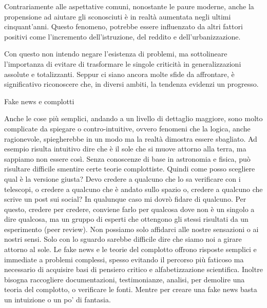 \documentclass[12pt]{book} %
\begin{document}
Contrariamente alle aspettative comuni, nonostante le paure moderne, anche la propensione ad aiutare gli sconosciuti è in realtà aumentata negli ultimi cinquant’anni. Questo fenomeno, potrebbe essere influenzato da altri fattori positivi come l’incremento dell’istruzione, del reddito e  dell’urbanizzazione.

Con questo non intendo negare l'esistenza di problemi, ma sottolineare l'importanza di evitare di trasformare le singole criticità in generalizzazioni assolute e totalizzanti. Seppur ci siano ancora molte sfide da affrontare, è significativo riconoscere che, in diversi ambiti, la tendenza evidenzi un progresso.

\begin{mdframed}[linewidth=1pt]
Fake news e complotti

Anche le cose più semplici, andando a un livello di dettaglio maggiore, sono molto complicate da spiegare o
contro-intuitive, ovvero fenomeni che la logica, anche ragionevole, spiegherebbe in un modo ma la realtà dimostra essere sbagliato. Ad esempio risulta intuitivo dire che è il sole che si muove attorno alla terra, ma sappiamo non essere così. 
Senza conoscenze di base in astronomia e fisica, può risultare difficile smentire certe teorie complottiste.
Quindi come posso scegliere qual è la versione giusta? 
Devo credere a qualcuno che lo sa verificare con i telescopi, o credere a qualcuno che è andato sullo
spazio o, credere a qualcuno che scrive un post sui social? In qualunque caso mi dovrò fidare di qualcuno. Per questo,
credere per credere, conviene farlo per qualcosa dove non è un singolo a dire qualcosa, ma un gruppo di esperti che
ottengono gli stessi risultati da un esperimento (peer review). Non possiamo solo affidarci alle nostre sensazioni o ai
nostri sensi. Solo con lo sguardo sarebbe difficile dire che siamo noi a girare attorno al sole. Le fake news e le teorie del complotto offrono risposte semplici e immediate a problemi complessi, spesso evitando il percorso più faticoso ma necessario di acquisire basi di pensiero critico e alfabetizzazione scientifica. Inoltre bisogna raccogliere
documentazioni, testimonianze, analisi, per demolire una teoria del complotto, o verificare le fonti. 
Mentre per creare una fake news basta un intuizione o un po' di fantasia.


\end{mdframed}
\end{document}
